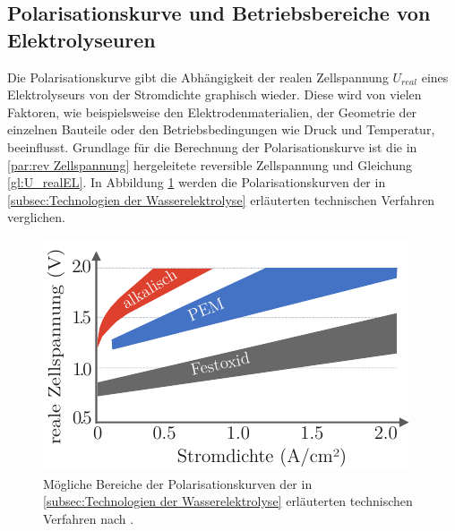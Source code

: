 \subsection{Polarisationskurve und Betriebsbereiche von Elektrolyseuren}
\label{subsec:Polarisationskurve}
Die Polarisationskurve gibt die Abhängigkeit der realen Zellspannung $U_{real}$ eines Elektrolyseurs von der Stromdichte graphisch wieder.  Diese wird von vielen Faktoren, wie beispielsweise den Elektrodenmaterialien, der Geometrie der einzelnen Bauteile oder den Betriebsbedingungen wie Druck und Temperatur, beeinflusst. Grundlage für die Berechnung der Polarisationskurve ist die in \ref{par:rev Zellspannung} hergeleitete reversible Zellspannung und Gleichung \ref{gl:U_realEL}. In Abbildung \ref{fig:PolarisationskurveElektrolyseure} werden die Polarisationskurven der in \ref{subsec:Technologien der Wasserelektrolyse} erläuterten technischen Verfahren verglichen.\\
\begin{figure}[h]
	\centering
		\includegraphics[scale=1]{Figures/PolarisationskurvenElektrolyseure}
		\caption{Mögliche Bereiche der Polarisationskurven der in \ref{subsec:Technologien der Wasserelektrolyse} erläuterten technischen Verfahren nach \citet{tremel_electrolysisfundamental_2018}.}
\label{fig:PolarisationskurveElektrolyseure}	
\end{figure}


